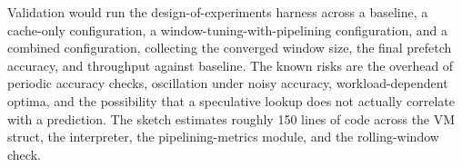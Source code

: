 Validation would run the design-of-experiments harness across a baseline, a
cache-only configuration, a window-tuning-with-pipelining configuration, and a
combined configuration, collecting the converged window size, the final prefetch
accuracy, and throughput against baseline. The known risks are the overhead of
periodic accuracy checks, oscillation under noisy accuracy, workload-dependent
optima, and the possibility that a speculative lookup does not actually
correlate with a prediction. The sketch estimates roughly 150 lines of code
across the VM struct, the interpreter, the pipelining-metrics module, and the
rolling-window check.


